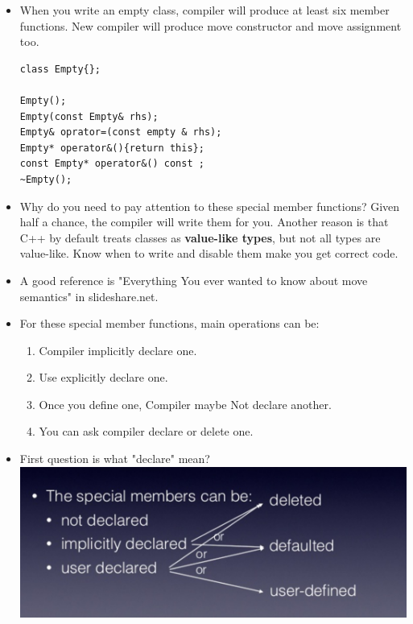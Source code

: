 \documentclass[a4paper,11pt,twoside]{book}
\begin{document}
\begin{itemize}

\item When you write an empty class, compiler will produce at least six member functions.  New compiler will produce move constructor and move assignment too.
\begin{lstlisting}[numbers=none]
class Empty{};

Empty();
Empty(const Empty& rhs);
Empty& oprator=(const empty & rhs);
Empty* operator&(){return this};
const Empty* operator&() const ;
~Empty();
\end{lstlisting}

\item Why do you need to pay attention to these special member functions?  Given half a chance, the compiler will write them for you. Another reason is that C++ by default treats classes as \textbf{value-like types}, but not all types are value-like. Know when to write and disable them make you get correct code.

\item A good reference is "Everything You ever wanted to know about move semantics" in slideshare.net.

\item For these special member functions, main operations can be:
\begin{enumerate}
\item Compiler implicitly declare one.
\item Use explicitly declare one.
\item Once you define one, Compiler maybe Not declare another.
\item You can ask compiler declare or delete one.
\end{enumerate}

\item First question is what "declare" mean?  \\
\includegraphics[scale=0.6]{pics/sm1.png} \newline


\end{itemize}
\end{document}
